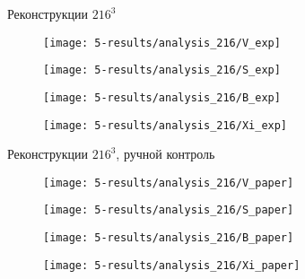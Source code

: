 \documentclass[12pt]{beamer}
\begin{document}
	\begin{frame}{Реконструкции $216^3$}
		\begin{figure}
			\begin{minipage}{0.45\linewidth}
				\centering
				\texttt{[image: 5-results/analysis\_216/V\_exp]}
			\end{minipage}
			\hfill
			\begin{minipage}[h]{0.45\linewidth}
				\centering
				\texttt{[image: 5-results/analysis\_216/S\_exp]}
			\end{minipage}
			\vfill
			\begin{minipage}[h]{0.45\linewidth}
				\centering
				\texttt{[image: 5-results/analysis\_216/B\_exp]}
			\end{minipage}
			\hfill
			\begin{minipage}[h]{0.45\linewidth}
				\centering
				\texttt{[image: 5-results/analysis\_216/Xi\_exp]}
			\end{minipage}
		\end{figure}
	\end{frame}

	\begin{frame}{Реконструкции $216^3$, ручной контроль}
		\begin{figure}
			\begin{minipage}{0.45\linewidth}
				\centering
				\texttt{[image: 5-results/analysis\_216/V\_paper]}
			\end{minipage}
			\hfill
			\begin{minipage}[h]{0.45\linewidth}
				\centering
				\texttt{[image: 5-results/analysis\_216/S\_paper]}
			\end{minipage}
			\vfill
			\begin{minipage}[h]{0.45\linewidth}
				\centering
				\texttt{[image: 5-results/analysis\_216/B\_paper]}
			\end{minipage}
			\hfill
			\begin{minipage}[h]{0.45\linewidth}
				\centering
				\texttt{[image: 5-results/analysis\_216/Xi\_paper]}
			\end{minipage}
		\end{figure}
	\end{frame}
	
\end{document}
